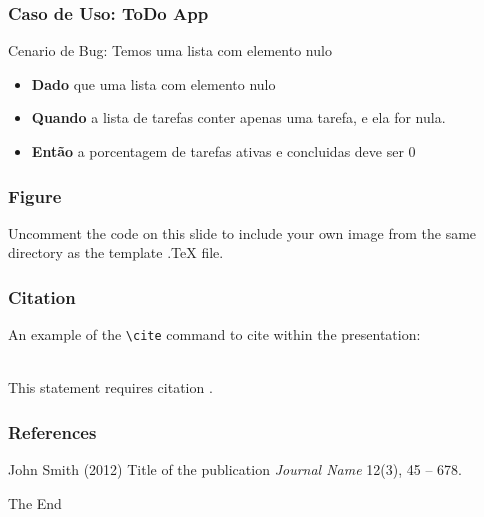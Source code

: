 \documentclass{beamer}
\begin{document}
\begin{frame}
	\frametitle{Caso de Uso: ToDo App}
	Cenario de Bug: Temos uma lista com elemento nulo
	\begin{itemize}
		\item \textbf{Dado} que uma lista com elemento nulo
		\item \textbf{Quando} a lista de tarefas conter apenas uma tarefa, e ela for nula.
		\item \textbf{Então} a porcentagem de tarefas ativas e concluidas deve ser 0
	\end{itemize}
\end{frame}


\begin{frame}
\frametitle{Figure}
Uncomment the code on this slide to include your own image from the same directory as the template .TeX file.
\end{frame}


\begin{frame}[fragile] %
\frametitle{Citation}
An example of the \verb|\cite| command to cite within the presentation:\\~

This statement requires citation \cite{p1}.
\end{frame}


\begin{frame}
\frametitle{References}
\footnotesize{
\begin{thebibliography}{99} %
 John Smith (2012)
\newblock Title of the publication
\newblock \emph{Journal Name} 12(3), 45 -- 678.
\end{thebibliography}
}
\end{frame}


\begin{frame}
\Huge{\centerline{The End}}
\end{frame}

\end{document}

